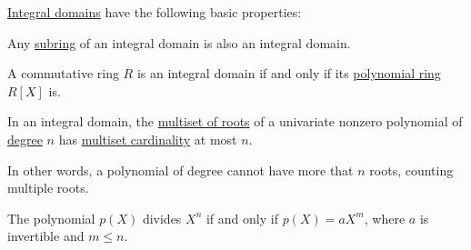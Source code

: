 \begin{proposition}\label{thm:def:integral_domain}
  \hyperref[def:integral_domain]{Integral domains} have the following basic properties:
  \begin{thmenum}
     Any \hyperref[def:ring/submodel]{subring} of an integral domain is also an integral domain.

     A commutative ring \( R \) is an integral domain if and only if its \hyperref[def:polynomial_algebra]{polynomial ring} \( R[X] \) is.

     In an integral domain, the \hyperref[def:polynomial_root]{multiset of roots} of a univariate nonzero polynomial of \hyperref[def:polynomial_degree]{degree} \( n \) has \hyperref[def:labeled_set/multiset]{multiset cardinality} at most \( n \).

    In other words, a polynomial of degree cannot have more that \( n \) roots, counting multiple roots.

     The polynomial \( p(X) \) divides \( X^n \) if and only if \( p(X) = aX^m \), where \( a \) is invertible and \( m \leq n \).
  \end{thmenum}
\end{proposition}
